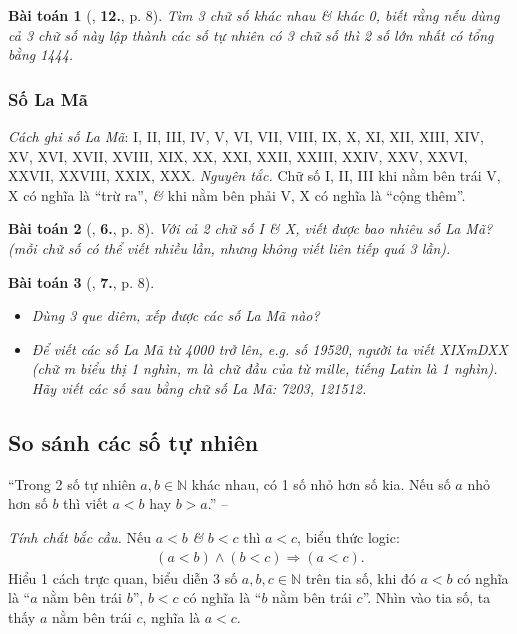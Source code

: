 \documentclass[oneside]{book}
\numberwithin{equation}{section}
\newtheorem{baitoan}{Bài toán}[section]
\begin{document}
\begin{baitoan}[\cite{Binh_Toan_6_tap_1}, \textbf{12.}, p. 8]
	Tìm 3 chữ số khác nhau \& khác 0, biết rằng nếu dùng cả 3 chữ số này lập thành các số tự nhiên có 3 chữ số thì 2 số lớn nhất có tổng bằng 1444.
\end{baitoan}	

\subsubsection{Số La Mã}
\textit{Cách ghi số La Mã}: I, II, III, IV, V, VI, VII, VIII, IX, X, XI, XII, XIII, XIV, XV, XVI, XVII, XVIII, XIX, XX, XXI, XXII, XXIII, XXIV, XXV, XXVI, XXVII, XXVIII, XXIX, XXX. \textit{Nguyên tắc.} Chữ số I, II, III khi nằm bên trái V, X có nghĩa là ``trừ ra'', \textit{\&} khi nằm bên phải V, X có nghĩa là ``cộng thêm''.

\begin{baitoan}[\cite{Binh_Toan_6_tap_1}, \textbf{6.}, p. 8]
	Với cả 2 chữ số I \& X, viết được bao nhiêu số La Mã? (mỗi chữ số có thể viết nhiều lần, nhưng không viết liên tiếp quá 3 lần).
\end{baitoan}

\begin{baitoan}[\cite{Binh_Toan_6_tap_1}, \textbf{7.}, p. 8]
	\begin{itemize}
		\item[(a)] Dùng 3 que diêm, xếp được các số La Mã nào?
		\item[(b)] Để viết các số La Mã từ 4000 trở lên, e.g. số 19520, người ta viết XIXmDXX (chữ m biểu thị \emph{1 nghìn}, m là chữ đầu của từ \emph{mille}, tiếng Latin là 1 nghìn). Hãy viết các số sau bằng chữ số La Mã: 7203, 121512.
	\end{itemize}
\end{baitoan}

\subsection{So sánh các số tự nhiên}
``Trong 2 số tự nhiên $a,b\in\mathbb{N}$ khác nhau, có 1 số nhỏ hơn số kia. Nếu số $a$ nhỏ hơn số $b$ thì viết $a < b$ hay $b > a$.'' -- \cite[p. 12]{Thai_Anh_Dat_Ha_Loan_Nam_Quang_Toan_6_tap_1}

\noindent\textit{Tính chất bắc cầu.} Nếu $a < b$ \textit{\&} $b < c$ thì $a < c$, biểu thức logic:
\begin{align*}
	(a < b)\land(b < c)\Rightarrow(a < c).
\end{align*}
Hiểu 1 cách trực quan, biểu diễn 3 số $a,b,c\in\mathbb{N}$ trên tia số, khi đó $a < b$ có nghĩa là ``$a$ nằm bên trái $b$'', $b < c$ có nghĩa là ``$b$ nằm bên trái $c$''. Nhìn vào tia số, ta thấy $a$ nằm bên trái $c$, nghĩa là $a < c$.
\end{document}
